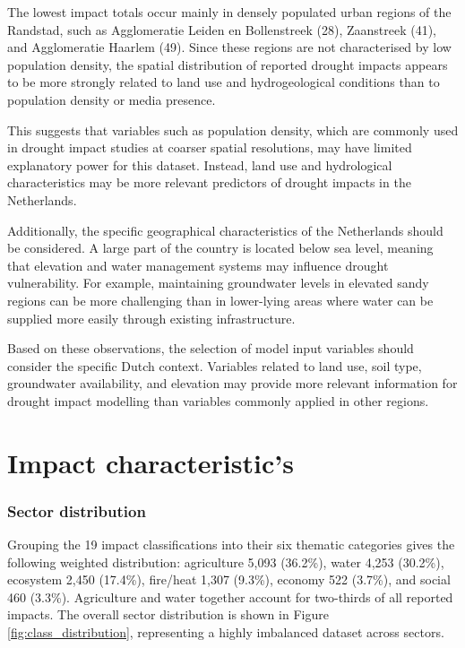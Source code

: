 The lowest impact totals occur mainly in densely populated urban regions of the Randstad, such as Agglomeratie Leiden en Bollenstreek (28), Zaanstreek (41), and Agglomeratie Haarlem (49). Since these regions are not characterised by low population density, the spatial distribution of reported drought impacts appears to be more strongly related to land use and hydrogeological conditions than to population density or media presence.

This suggests that variables such as population density, which are commonly used in drought impact studies at coarser spatial resolutions, may have limited explanatory power for this dataset. Instead, land use and hydrological characteristics may be more relevant predictors of drought impacts in the Netherlands.

Additionally, the specific geographical characteristics of the Netherlands should be considered. A large part of the country is located below sea level, meaning that elevation and water management systems may influence drought vulnerability. For example, maintaining groundwater levels in elevated sandy regions can be more challenging than in lower-lying areas where water can be supplied more easily through existing infrastructure.

Based on these observations, the selection of model input variables should consider the specific Dutch context. Variables related to land use, soil type, groundwater availability, and elevation may provide more relevant information for drought impact modelling than variables commonly applied in other regions.

\section{Impact characteristic's}

\subsubsection{Sector distribution}

Grouping the 19 impact classifications into their six thematic categories
gives the following weighted distribution: agriculture 5,093 (36.2\%),
water 4,253 (30.2\%), ecosystem 2,450 (17.4\%), fire/heat 1,307 (9.3\%),
economy 522 (3.7\%), and social 460 (3.3\%). Agriculture and water together
account for two-thirds of all reported impacts. The overall sector distribution is shown in Figure \ref{fig:class_distribution}, representing a highly imbalanced dataset across sectors.

